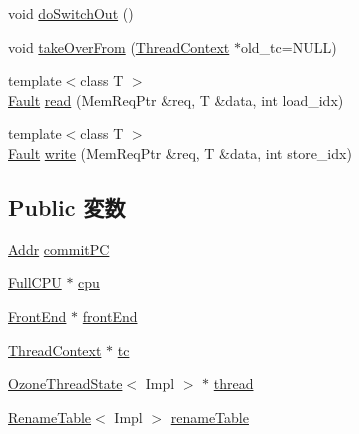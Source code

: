 \begin{DoxyCompactItemize}
void \hyperlink{classInorderBackEnd_a039b639c41c289e1cfe6d71c41d9308c}{doSwitchOut} ()
\item 
void \hyperlink{classInorderBackEnd_a5a901e7ec5b94a55bd61fde88ad0b7f1}{takeOverFrom} (\hyperlink{classThreadContext}{ThreadContext} $\ast$old\_\-tc=NULL)
\item 
{\footnotesize template$<$class T $>$ }\\\hyperlink{classRefCountingPtr}{Fault} \hyperlink{classInorderBackEnd_ad2981b6704bca036af0723daaaebe57e}{read} (MemReqPtr \&req, T \&data, int load\_\-idx)
\item 
{\footnotesize template$<$class T $>$ }\\\hyperlink{classRefCountingPtr}{Fault} \hyperlink{classInorderBackEnd_a173162a41482ee35c5a15394b4befa4b}{write} (MemReqPtr \&req, T \&data, int store\_\-idx)
\end{DoxyCompactItemize}
\subsection*{Public 変数}
\begin{DoxyCompactItemize}
\item 
\hyperlink{base_2types_8hh_af1bb03d6a4ee096394a6749f0a169232}{Addr} \hyperlink{classInorderBackEnd_af043d6103c5f173871f527899c41d2d2}{commitPC}
\item 
\hyperlink{classInorderBackEnd_a90ba84e54618cc07f2e8f05e046cb5ce}{FullCPU} $\ast$ \hyperlink{classInorderBackEnd_a766385c2941cd46525f4d9dff90200a2}{cpu}
\item 
\hyperlink{classFrontEnd}{FrontEnd} $\ast$ \hyperlink{classInorderBackEnd_a67c762418bb2017cb2dce5a0c94f0788}{frontEnd}
\item 
\hyperlink{classThreadContext}{ThreadContext} $\ast$ \hyperlink{classInorderBackEnd_a4455a4759e69e5ebe68ae7298cbcc37d}{tc}
\item 
\hyperlink{structOzoneThreadState}{OzoneThreadState}$<$ Impl $>$ $\ast$ \hyperlink{classInorderBackEnd_ab6f834310107fd693035eba2eeca583f}{thread}
\item 
\hyperlink{classRenameTable}{RenameTable}$<$ Impl $>$ \hyperlink{classInorderBackEnd_af8d3f859e7c0dd9408ba99de6f415616}{renameTable}
\end{DoxyCompactItemize}
